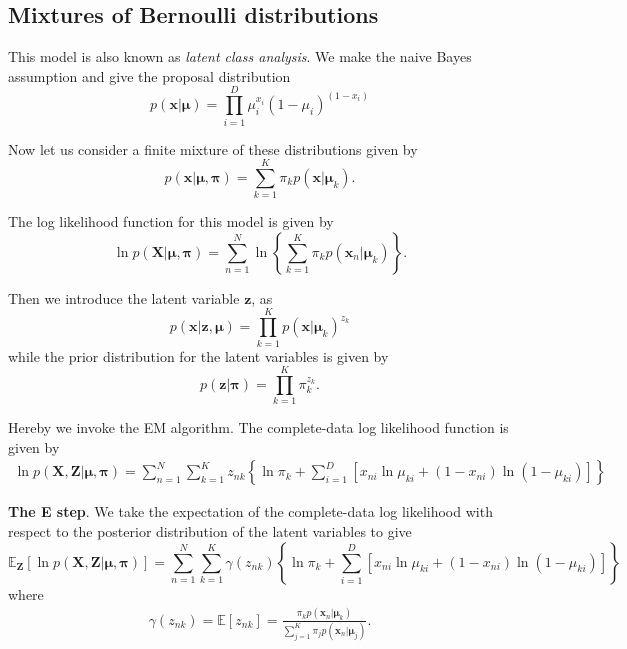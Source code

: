 \documentclass[a4paper]{report}
\renewcommand{\bf}{\mathbf}
\newcommand{\bb}{\mathbb}
\newcommand{\imp}[1]{{\color{blue}\textit{#1}}}
\newcommand{\bs}{\boldsymbol}
\begin{document}
\subsection{Mixtures of Bernoulli distributions}
This model is also known as \imp{latent class analysis}. We make the naive Bayes assumption and give the proposal distribution
\begin{equation}
	p(\bf{x}|\bs{\mu}) = \prod_{i=1}^D \mu_i^{x_i}(1-\mu_i)^{(1-x_i)}
\end{equation}

Now let us consider a finite mixture of these distributions given by
\begin{equation}
	p(\bf{x}|\bs{\mu,\pi}) = \sum_{k=1}^K \pi_k p(\bf{x}|\bs{\mu}_k).
\end{equation}

The log likelihood function for this model is given by
\begin{equation}
	\ln p(\bf{X}|\bs{\mu,\pi}) = \sum_{n=1}^N \ln \left\{ \sum_{k=1}^K \pi_k p(\bf{x}_n|\bs{\mu}_k) \right\}.
\end{equation}

Then we introduce the latent variable $\bf{z}$, as
\begin{equation}
	p(\bf{x|z},\bs{\mu}) = \prod_{k=1}^K p(\bf{x}|\bs{\mu}_k)^{z_k}
\end{equation}
while the prior distribution for the latent variables is given by
\begin{equation}
	p(\bf{z}|\bs{\pi}) = \prod_{k=1}^K \pi_k^{z_k}.
\end{equation}

Hereby we invoke the EM algorithm. The complete-data log likelihood function is given by
\begin{align}
	\ln p(\bf{X,Z}|\bs{\mu,\pi}) = \sum_{n=1}^{N} \sum_{k=1}^K z_{nk}  \left\{   \ln \pi_k 
	+ \sum_{i=1}^D [ x_{ni}\ln \mu_{ki}+(1-x_{ni})\ln(1-\mu_{ki}) ]  \right\} 
\end{align}

\textbf{The E step}. We take the expectation of the complete-data log likelihood with respect to the posterior distribution of the latent variables to give
\begin{equation}
	\bb{E}_{\bf{Z}}[\ln p(\bf{X,Z}|\bs{\mu,\pi})]=\sum_{n=1}^{N}\sum_{k=1}^K \gamma(z_{nk})\left\{\ln \pi_k + \sum_{i=1}^D [x_{ni}\ln \mu_{ki}+(1-x_{ni})\ln(1-\mu_{ki})] \right\}\label{BMME}
\end{equation}
where
\begin{align}
	\gamma(z_{nk}) =  \bb{E}[z_{nk}] = \frac{\pi_k p(\bf{x}_n|\bs{\mu}_k)}{\sum_{j=1}^K \pi_j p(\bf{x}_n|\bs{\mu}_j)}.
\end{align}
\end{document}
